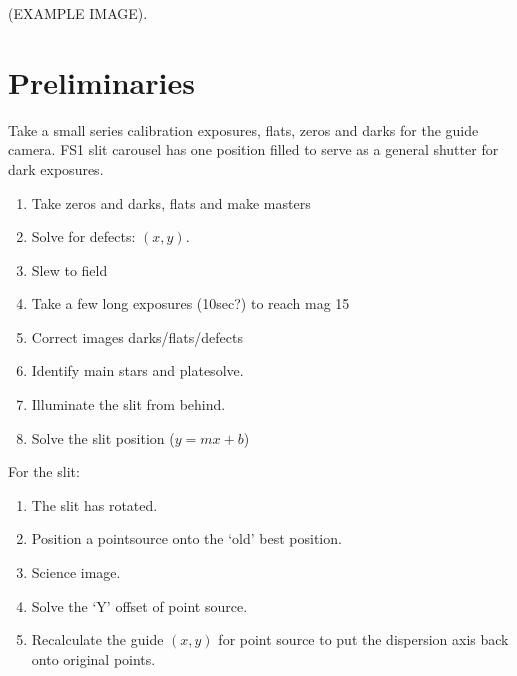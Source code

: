 \documentclass[letterpaper,10pt,english,openany,oneside]{sphinxmanual}
\begin{document}
\sphinxAtStartPar
(EXAMPLE IMAGE).


\section{Preliminaries}
\label{\detokenize{guiding:preliminaries}}
\sphinxAtStartPar
Take a small series calibration exposures, flats, zeros and
darks for the guide camera. FS1 slit carousel has one position
filled to serve as a general shutter for dark exposures.
\begin{enumerate}
%
\item {} 
\sphinxAtStartPar
Take zeros and darks, flats and make masters

\item {} 
\sphinxAtStartPar
Solve for defects: \((x,y)\).

\item {} 
\sphinxAtStartPar
Slew to field

\item {} 
\sphinxAtStartPar
Take a few long exposures (10sec?) to reach mag 15

\item {} 
\sphinxAtStartPar
Correct images darks/flats/defects

\item {} 
\sphinxAtStartPar
Identify main stars and platesolve.

\item {} 
\sphinxAtStartPar
Illuminate the slit from behind.

\item {} 
\sphinxAtStartPar
Solve the slit position (\(y = mx+b\))

\end{enumerate}

\sphinxAtStartPar
For the slit:
\begin{enumerate}
%
\item {} 
\sphinxAtStartPar
The slit has rotated.

\item {} 
\sphinxAtStartPar
Position a point\sphinxhyphen{}source onto the ‘old’ best position.

\item {} 
\sphinxAtStartPar
Science image.

\item {} 
\sphinxAtStartPar
Solve the ‘Y’ offset of point source.

\item {} 
\sphinxAtStartPar
Recalculate the guide \((x,y)\) for point source to put the dispersion axis back onto original points.

\end{enumerate}
\end{document}
